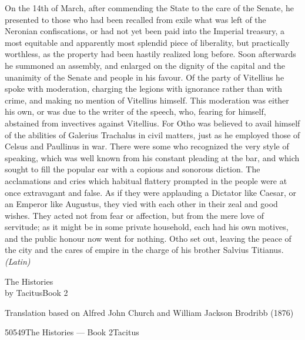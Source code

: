 On the 14th of March, after commending the State to the care of the Senate, he presented to those who had been recalled from exile what was left of the Neronian confiscations, or had not yet been paid into the Imperial treasury, a most equitable and apparently most splendid piece of liberality, but practically worthless, as the property had been hastily realized long before. Soon afterwards he summoned an assembly, and enlarged on the dignity of the capital and the unanimity of the Senate and people in his favour. Of the party of Vitellius he spoke with moderation, charging the legions with ignorance rather than with crime, and making no mention of Vitellius himself. This moderation was either his own, or was due to the writer of the speech, who, fearing for himself, abstained from invectives against Vitellius. For Otho was believed to avail himself of the abilities of Galerius Trachalus in civil matters, just as he employed those of Celsus and Paullinus in war. There were some who recognized the very style of speaking, which was well known from his constant pleading at the bar, and which sought to fill the popular ear with a copious and sonorous diction. The acclamations and cries which habitual flattery prompted in the people were at once extravagant and false. As if they were applauding a Dictator like Caesar, or an Emperor like Augustus, they vied with each other in their zeal and good wishes. They acted not from fear or affection, but from the mere love of servitude; as it might be in some private household, each had his own motives, and the public honour now went for nothing. Otho set out, leaving the peace of the city and the cares of empire in the charge of his brother Salvius Titianus. \emph{(Latin)}



The Histories\\
by TacitusBook 2

Translation based on Alfred John Church and William Jackson Brodribb (1876)

50549The Histories — Book 2Tacitus


